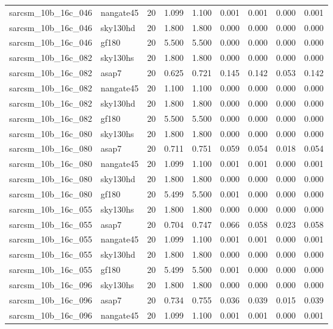 \begin{tabular}{llrrrrrrr}
sarcsm\_10b\_16c\_046 & nangate45 & 20 & 1.099 & 1.100 & 0.001 & 0.001 & 0.000 & 0.001 \\
sarcsm\_10b\_16c\_046 & sky130hd & 20 & 1.800 & 1.800 & 0.000 & 0.000 & 0.000 & 0.000 \\
sarcsm\_10b\_16c\_046 & gf180 & 20 & 5.500 & 5.500 & 0.000 & 0.000 & 0.000 & 0.000 \\
sarcsm\_10b\_16c\_082 & sky130hs & 20 & 1.800 & 1.800 & 0.000 & 0.000 & 0.000 & 0.000 \\
sarcsm\_10b\_16c\_082 & asap7 & 20 & 0.625 & 0.721 & 0.145 & 0.142 & 0.053 & 0.142 \\
sarcsm\_10b\_16c\_082 & nangate45 & 20 & 1.100 & 1.100 & 0.000 & 0.000 & 0.000 & 0.000 \\
sarcsm\_10b\_16c\_082 & sky130hd & 20 & 1.800 & 1.800 & 0.000 & 0.000 & 0.000 & 0.000 \\
sarcsm\_10b\_16c\_082 & gf180 & 20 & 5.500 & 5.500 & 0.000 & 0.000 & 0.000 & 0.000 \\
sarcsm\_10b\_16c\_080 & sky130hs & 20 & 1.800 & 1.800 & 0.000 & 0.000 & 0.000 & 0.000 \\
sarcsm\_10b\_16c\_080 & asap7 & 20 & 0.711 & 0.751 & 0.059 & 0.054 & 0.018 & 0.054 \\
sarcsm\_10b\_16c\_080 & nangate45 & 20 & 1.099 & 1.100 & 0.001 & 0.001 & 0.000 & 0.001 \\
sarcsm\_10b\_16c\_080 & sky130hd & 20 & 1.800 & 1.800 & 0.000 & 0.000 & 0.000 & 0.000 \\
sarcsm\_10b\_16c\_080 & gf180 & 20 & 5.499 & 5.500 & 0.001 & 0.000 & 0.000 & 0.000 \\
sarcsm\_10b\_16c\_055 & sky130hs & 20 & 1.800 & 1.800 & 0.000 & 0.000 & 0.000 & 0.000 \\
sarcsm\_10b\_16c\_055 & asap7 & 20 & 0.704 & 0.747 & 0.066 & 0.058 & 0.023 & 0.058 \\
sarcsm\_10b\_16c\_055 & nangate45 & 20 & 1.099 & 1.100 & 0.001 & 0.001 & 0.000 & 0.001 \\
sarcsm\_10b\_16c\_055 & sky130hd & 20 & 1.800 & 1.800 & 0.000 & 0.000 & 0.000 & 0.000 \\
sarcsm\_10b\_16c\_055 & gf180 & 20 & 5.499 & 5.500 & 0.001 & 0.000 & 0.000 & 0.000 \\
sarcsm\_10b\_16c\_096 & sky130hs & 20 & 1.800 & 1.800 & 0.000 & 0.000 & 0.000 & 0.000 \\
sarcsm\_10b\_16c\_096 & asap7 & 20 & 0.734 & 0.755 & 0.036 & 0.039 & 0.015 & 0.039 \\
sarcsm\_10b\_16c\_096 & nangate45 & 20 & 1.099 & 1.100 & 0.001 & 0.001 & 0.000 & 0.001 \\

\end{tabular}
